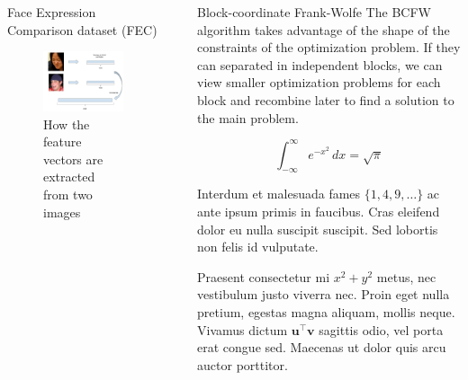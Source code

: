 \documentclass[final]{beamer}
\newlength{\sepwidth}
\newlength{\colwidth}
\newcommand{\separatorcolumn}{\begin{column}{\sepwidth}\end{column}}
\begin{document}
\begin{frame}[t]
\begin{columns}[t]
\begin{column}{\colwidth}
\begin{alertblock}{Face Expression Comparison dataset (FEC)}
    \begin{figure}
      \includegraphics[scale=0.75]{img/fec_poster.jpg}
      \caption{How the feature vectors are extracted from two images}
      \label{feat_vec}
    \end{figure}
  \end{alertblock}

\end{column}

\separatorcolumn

\begin{column}{\colwidth}

  \begin{block}{Block-coordinate Frank-Wolfe}
    The BCFW algorithm takes advantage of the shape of the constraints of the optimization problem. If they can separated in independent
    blocks, we can view smaller optimization problems for each block and recombine later to find a solution to the main problem. 

    $$
    \int_{-\infty}^{\infty} e^{-x^2}\,dx = \sqrt{\pi}
    $$

    Interdum et malesuada fames $\{1, 4, 9, \ldots\}$ ac ante ipsum primis in
    faucibus. Cras eleifend dolor eu nulla suscipit suscipit. Sed lobortis non
    felis id vulputate.


    Praesent consectetur mi $x^2 + y^2$ metus, nec vestibulum justo viverra
    nec. Proin eget nulla pretium, egestas magna aliquam, mollis neque. Vivamus
    dictum $\mathbf{u}^\intercal\mathbf{v}$ sagittis odio, vel porta erat
    congue sed. Maecenas ut dolor quis arcu auctor porttitor.


\end{block}
\end{column}
\end{columns}
\end{frame}
\end{document}
